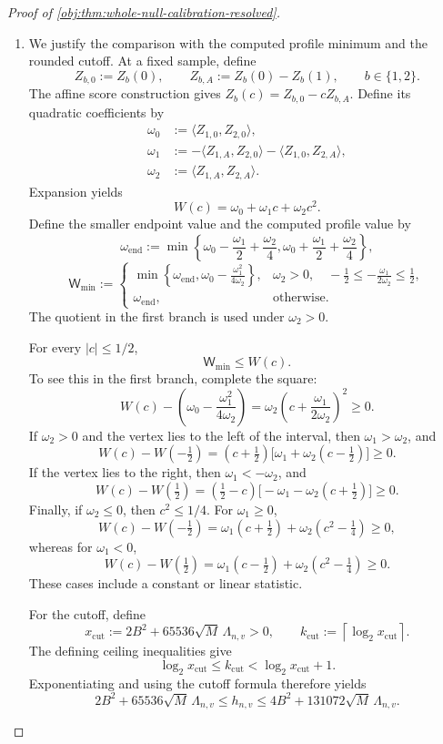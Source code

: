 \documentclass[11pt]{article}
\begin{document}
\begin{proof}[Proof of \cref{obj:thm:whole-null-calibration-resolved}]
\begin{enumerate}
\item We justify the comparison with the computed profile minimum and the rounded cutoff. At a fixed sample, define
\[
Z_{b,0}:=Z_b(0),
\qquad
Z_{b,A}:=Z_b(0)-Z_b(1),
\qquad b\in\{1,2\}.
\]
The affine score construction gives \(Z_b(c)=Z_{b,0}-cZ_{b,A}\). Define its quadratic coefficients by
\[
\begin{aligned}
\omega_0&:=\langle Z_{1,0},Z_{2,0}\rangle,\\
\omega_1&:=-\langle Z_{1,A},Z_{2,0}\rangle
           -\langle Z_{1,0},Z_{2,A}\rangle,\\
\omega_2&:=\langle Z_{1,A},Z_{2,A}\rangle.
\end{aligned}
\]
Expansion yields
\[
W(c)=\omega_0+\omega_1c+\omega_2c^2.
\]
Define the smaller endpoint value and the computed profile value by
\[
\omega_{\mathrm{end}}
:=
\min\left\{
\omega_0-\frac{\omega_1}{2}+\frac{\omega_2}{4},
\omega_0+\frac{\omega_1}{2}+\frac{\omega_2}{4}
\right\},
\]
\[
\mathsf W_{\min}
:=
\begin{cases}
\displaystyle
\min\left\{\omega_{\mathrm{end}},
\omega_0-\frac{\omega_1^2}{4\omega_2}\right\},
&
\displaystyle
\omega_2>0,\quad
-\frac12\le-\frac{\omega_1}{2\omega_2}\le\frac12,\\[2mm]
\omega_{\mathrm{end}},&\text{otherwise}.
\end{cases}
\]
The quotient in the first branch is used under \(\omega_2>0\).

For every \(|c|\le1/2\),
\[
\mathsf W_{\min}\le W(c).
\]
To see this in the first branch, complete the square:
\[
W(c)-\left(\omega_0-\frac{\omega_1^2}{4\omega_2}\right)
=
\omega_2\left(c+\frac{\omega_1}{2\omega_2}\right)^2
\ge0.
\]
If \(\omega_2>0\) and the vertex lies to the left of the interval, then \(\omega_1>\omega_2\), and
\[
W(c)-W(-\tfrac12)
=
(c+\tfrac12)\bigl[\omega_1+\omega_2(c-\tfrac12)\bigr]
\ge0.
\]
If the vertex lies to the right, then \(\omega_1<-\omega_2\), and
\[
W(c)-W(\tfrac12)
=
(\tfrac12-c)\bigl[-\omega_1-\omega_2(c+\tfrac12)\bigr]
\ge0.
\]
Finally, if \(\omega_2\le0\), then \(c^2\le1/4\). For \(\omega_1\ge0\),
\[
W(c)-W(-\tfrac12)
=
\omega_1(c+\tfrac12)+\omega_2(c^2-\tfrac14)
\ge0,
\]
whereas for \(\omega_1<0\),
\[
W(c)-W(\tfrac12)
=
\omega_1(c-\tfrac12)+\omega_2(c^2-\tfrac14)
\ge0.
\]
These cases include a constant or linear statistic.

For the cutoff, define
\[
x_{\mathrm{cut}}
:=2B^2+65536\sqrt M\,\Lambda_{n,v}>0,
\qquad
k_{\mathrm{cut}}
:=\left\lceil\log_2 x_{\mathrm{cut}}\right\rceil.
\]
The defining ceiling inequalities give
\[
\log_2 x_{\mathrm{cut}}
\le k_{\mathrm{cut}}
<\log_2 x_{\mathrm{cut}}+1.
\]
Exponentiating and using the cutoff formula therefore yields
\[
2B^2+65536\sqrt M\,\Lambda_{n,v}
\le h_{n,v}
\le4B^2+131072\sqrt M\,\Lambda_{n,v}.
\]


\end{enumerate}
\end{proof}
\end{document}
